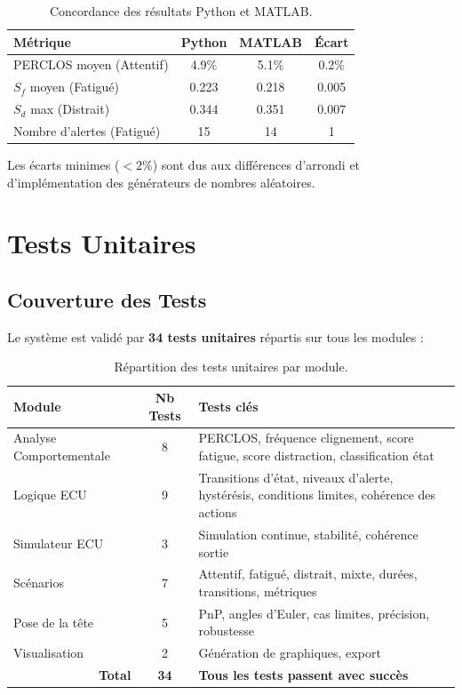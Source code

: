 \documentclass[12pt,a4paper,twoside]{report}
\begin{document}
\begin{table}[H]
\centering
\caption{Concordance des résultats Python et MATLAB.}
\label{tab:concordance}
\renewcommand{\arraystretch}{1.3}
\begin{tabular}{|l|c|c|c|}
\hline
\rowcolor{stellantisblue!15}
\textbf{Métrique} & \textbf{Python} & \textbf{MATLAB} & \textbf{Écart} \\
\hline
PERCLOS moyen (Attentif) & 4.9\% & 5.1\% & 0.2\% \\
\hline
$S_f$ moyen (Fatigué) & 0.223 & 0.218 & 0.005 \\
\hline
$S_d$ max (Distrait) & 0.344 & 0.351 & 0.007 \\
\hline
Nombre d'alertes (Fatigué) & 15 & 14 & 1 \\
\hline
\end{tabular}
\end{table}

Les écarts minimes ($< 2\%$) sont dus aux différences d'arrondi et d'implémentation des générateurs de nombres aléatoires.

\section{Tests Unitaires}

\subsection{Couverture des Tests}

Le système est validé par \textbf{34 tests unitaires} répartis sur tous les modules :

\begin{table}[H]
\centering
\caption{Répartition des tests unitaires par module.}
\label{tab:unit_tests}
\renewcommand{\arraystretch}{1.3}
\begin{tabularx}{\textwidth}{|l|c|X|}
\hline
\rowcolor{stellantisblue!15}
\textbf{Module} & \textbf{Nb Tests} & \textbf{Tests clés} \\
\hline
Analyse Comportementale & 8 & PERCLOS, fréquence clignement, score fatigue, score distraction, classification état \\
\hline
Logique ECU & 9 & Transitions d'état, niveaux d'alerte, hystérésis, conditions limites, cohérence des actions \\
\hline
Simulateur ECU & 3 & Simulation continue, stabilité, cohérence sortie \\
\hline
Scénarios & 7 & Attentif, fatigué, distrait, mixte, durées, transitions, métriques \\
\hline
Pose de la tête & 5 & PnP, angles d'Euler, cas limites, précision, robustesse \\
\hline
Visualisation & 2 & Génération de graphiques, export \\
\hline
\multicolumn{1}{|r|}{\textbf{Total}} & \textbf{34} & \textbf{Tous les tests passent avec succès} \\
\hline
\end{tabularx}
\end{table}
\end{document}
